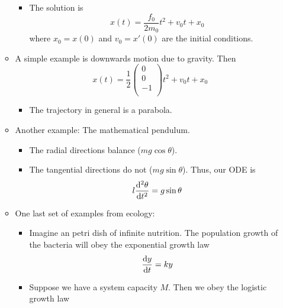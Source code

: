 \documentclass[../notes.tex]{subfiles}
\begin{document}
\begin{itemize}
\begin{itemize}
        \begin{itemize}
            \item The solution is
            \begin{equation*}
                x(t) = \frac{f_0}{2m_0}t^2+v_0t+x_0
            \end{equation*}
            where $x_0=x(0)$ and $v_0=x'(0)$ are the initial conditions.
        \end{itemize}
        \item A simple example is downwards motion due to gravity. Then
        \begin{equation*}
            x(t) = \frac{1}{2}
            \begin{pmatrix}
                0\\
                0\\
                -1\\
            \end{pmatrix}
            t^2+v_0t+x_0
        \end{equation*}
        \begin{itemize}
            \item The trajectory in general is a parabola.
        \end{itemize}
        \item Another example: The mathematical pendulum.
        \begin{itemize}
            \item The radial directions balance ($mg\cos\theta$).
            \item The tangential directions do not ($mg\sin\theta$). Thus, our ODE is
            \begin{equation*}
                l\dv[2]{\theta}{t} = g\sin\theta
            \end{equation*}
        \end{itemize}
        \item One last set of examples from ecology:
        \begin{itemize}
            \item Imagine an petri dish of infinite nutrition. The population growth of the bacteria will obey the exponential growth law
            \begin{equation*}
                \dv{y}{t} = ky
            \end{equation*}
            \item Suppose we have a system capacity $M$. Then we obey the logistic growth law
            \begin{equation*}

\end{equation*}
\end{itemize}
\end{itemize}
\end{itemize}
\end{document}
